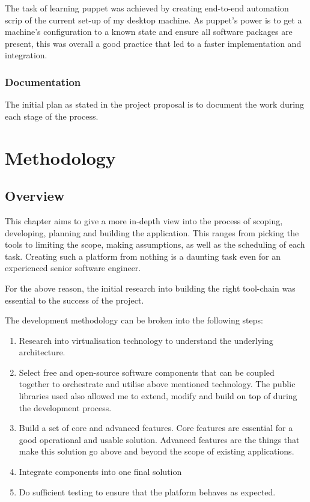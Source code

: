 \documentclass{article}
\begin{document}
The task of learning \gls{puppet} was achieved by creating end-to-end automation scrip of the current set-up of my desktop machine. As puppet's power is to get a machine's configuration to a known state and ensure all software packages are present, this was overall a good practice that led to a faster implementation and integration.

\subsubsection{Documentation}
The initial plan as stated in the project proposal is to document the work during each stage of the process. 



\newpage
\section{Methodology}
\subsection{Overview}
This chapter aims to give a more in-depth view into the process of scoping, developing, planning and building the application. This ranges from picking the tools to limiting the scope, making assumptions, as well as the scheduling of each task. Creating such a platform from nothing is a daunting task even for an experienced senior software engineer.

For the above reason, the initial research into building the right tool-chain was essential to the success of the project.

The development methodology can be broken into the following steps:
\begin{enumerate}
	\item
	      Research into virtualisation technology to understand the underlying architecture.

	\item
	      Select free and open-source software components that can be coupled together to orchestrate and utilise above mentioned technology. The public libraries used also allowed me to extend, modify and build on top of during the development process.

	\item
	      Build a set of core and advanced features. Core features are essential for a good operational and usable solution. Advanced features are the things that make this solution go above and beyond the scope of existing applications.

	\item
	      Integrate components into one final solution

	\item
	      Do sufficient testing to ensure that the platform behaves as expected.
\end{enumerate}
\end{document}

